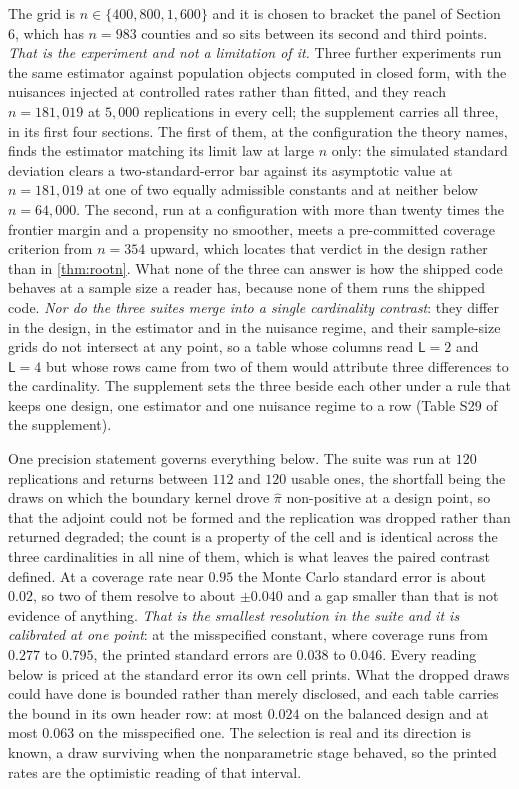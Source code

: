 \documentclass[
  12pt]{article}
\newcommand{\1}[1]{\mathds{1}\left[#1\right]}
\theoremstyle{plain}
\theoremstyle{definition}
\theoremstyle{definition}
\theoremstyle{remark}
\begin{document}
The grid is \(n\in\{400,800,1{,}600\}\) and it is chosen to bracket the
panel of Section 6, which has \(n=983\) counties and so sits between its
second and third points. \emph{That is the experiment and not a
limitation of it.} Three further experiments run the same estimator
against population objects computed in closed form, with the nuisances
injected at controlled rates rather than fitted, and they reach
\(n=181{,}019\) at \(5{,}000\) replications in every cell; the
supplement carries all three, in its first four sections. The first of
them, at the configuration the theory names, finds the estimator
matching its limit law at large \(n\) only: the simulated standard
deviation clears a two-standard-error bar against its asymptotic value
at \(n=181{,}019\) at one of two equally admissible constants and at
neither below \(n=64{,}000\). The second, run at a configuration with
more than twenty times the frontier margin and a propensity no smoother,
meets a pre-committed coverage criterion from \(n=354\) upward, which
locates that verdict in the design rather than in \cref{thm:rootn}. What
none of the three can answer is how the shipped code behaves at a sample
size a reader has, because none of them runs the shipped code. \emph{Nor
do the three suites merge into a single cardinality contrast}: they
differ in the design, in the estimator and in the nuisance regime, and
their sample-size grids do not intersect at any point, so a table whose
columns read \(\mathsf L=2\) and \(\mathsf L=4\) but whose rows came
from two of them would attribute three differences to the cardinality.
The supplement sets the three beside each other under a rule that keeps
one design, one estimator and one nuisance regime to a row (Table S29 of
the supplement).

One precision statement governs everything below. The suite was run at
\(120\) replications and returns between \(112\) and \(120\) usable
ones, the shortfall being the draws on which the boundary kernel drove
\(\hat\pi\) non-positive at a design point, so that the adjoint could
not be formed and the replication was dropped rather than returned
degraded; the count is a property of the cell and is identical across
the three cardinalities in all nine of them, which is what leaves the
paired contrast defined. At a coverage rate near \(0.95\) the Monte
Carlo standard error is about \(0.02\), so two of them resolve to about
\(\pm0.040\) and a gap smaller than that is not evidence of anything.
\emph{That is the smallest resolution in the suite and it is calibrated
at one point}: at the misspecified constant, where coverage runs from
\(0.277\) to \(0.795\), the printed standard errors are \(0.038\) to
\(0.046\). Every reading below is priced at the standard error its own
cell prints. What the dropped draws could have done is bounded rather
than merely disclosed, and each table carries the bound in its own
header row: at most \(0.024\) on the balanced design and at most
\(0.063\) on the misspecified one. The selection is real and its
direction is known, a draw surviving when the nonparametric stage
behaved, so the printed rates are the optimistic reading of that
interval.
\end{document}

